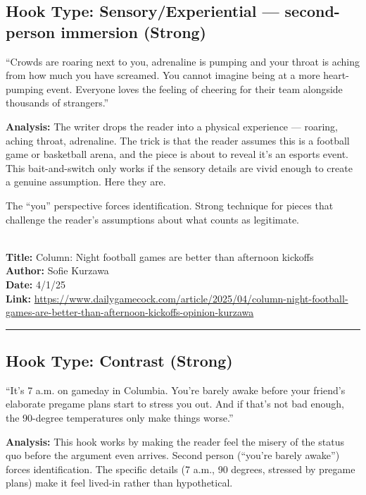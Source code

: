 \documentclass[12pt]{article}
\newcounter{examplenum}
\newcommand{\totalexamples}{10}
\newcommand{\exampleheader}[4]{%
    \newpage
    \stepcounter{examplenum}%
    \noindent{\large\bfseries\color{garnet} Example \theexamplenum\ of \totalexamples}\\[6pt]
    \textbf{Title:} #1\\
    \textbf{Author:} #2\\
    \textbf{Date:} #3\\
    \textbf{Link:} \url{#4}\\[4pt]
    \noindent\rule{\textwidth}{0.4pt}
    \vspace{6pt}
}
\begin{document}
\subsection*{Hook Type: Sensory/Experiential --- second-person immersion (Strong)}

\begin{promptbox}
``Crowds are roaring next to you, adrenaline is pumping and your throat is aching from how much you have screamed. You cannot imagine being at a more heart-pumping event. Everyone loves the feeling of cheering for their team alongside thousands of strangers.''
\end{promptbox}

\textbf{Analysis:} The writer drops the reader into a physical experience --- roaring, aching throat, adrenaline. The trick is that the reader assumes this is a football game or basketball arena, and the piece is about to reveal it's an esports event. This bait-and-switch only works if the sensory details are vivid enough to create a genuine assumption. Here they are.

The ``you'' perspective forces identification. Strong technique for pieces that challenge the reader's assumptions about what counts as legitimate.

\exampleheader
{Column: Night football games are better than afternoon kickoffs}
{Sofie Kurzawa}
{4/1/25}
{https://www.dailygamecock.com/article/2025/04/column-night-football-games-are-better-than-afternoon-kickoffs-opinion-kurzawa}

\subsection*{Hook Type: Contrast (Strong)}

\begin{promptbox}
``It's 7 a.m. on gameday in Columbia. You're barely awake before your friend's elaborate pregame plans start to stress you out. And if that's not bad enough, the 90-degree temperatures only make things worse.''
\end{promptbox}

\textbf{Analysis:} This hook works by making the reader feel the misery of the status quo before the argument even arrives. Second person (``you're barely awake'') forces identification. The specific details (7 a.m., 90 degrees, stressed by pregame plans) make it feel lived-in rather than hypothetical.
\end{document}
